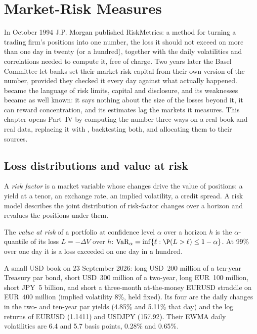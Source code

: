 \chapter{Market-Risk Measures}\label{ch:rc:market-risk-measures}

In October 1994 J.P. Morgan published RiskMetrics: a method for turning a trading firm's
positions into one number, the loss it should not exceed on more than one day in twenty (or
a hundred), together with the daily volatilities and correlations needed to compute it, free
of charge. Two years later the Basel Committee let banks set their market-risk capital from
their own version of the number, provided they checked it every day against what actually
happened.  became the language of risk limits, capital and disclosure, and its
weaknesses became as well known: it says nothing about the size of the losses beyond it, it
can reward concentration, and its estimates lag the markets it measures. This chapter opens
Part~IV by computing the number three ways on a real book and real data, replacing it with
, backtesting both, and allocating them to their sources.

\section{Loss distributions and value at risk}

\begin{definition}\label{def:rc:market-risk-measures:factor}
A \emph{risk factor} is a market variable whose changes drive the value
of positions: a yield at a tenor, an exchange rate, an implied volatility, a credit spread.
A risk model describes the joint distribution of risk-factor changes over a horizon and
revalues the positions under them.
\end{definition}

\begin{definition}\label{def:rc:market-risk-measures:var}
The \emph{value at risk} of a portfolio at confidence level $\alpha$ over a
horizon $h$ is the $\alpha$-quantile of its loss $L = -\Delta V$ over $h$:
$\mathrm{VaR}_\alpha = \inf\{\ell:\P(L>\ell)\le1-\alpha\}$. At 99\% over one day it is a loss exceeded on
one day in a hundred.
\end{definition}

\begin{example}\label{ex:rc:market-risk-measures:book}
A small USD book on 23 September 2026: long USD~200 million of a ten-year Treasury par bond,
short USD~300 million of a two-year, long EUR~100 million, short JPY~5 billion, and short a
three-month at-the-money EURUSD straddle on EUR~400 million (implied volatility 8\%, held
fixed). Its four  are the daily changes in the two- and ten-year par yields (4.85\%
and 5.11\% that day) and the log returns of EURUSD (1.1411) and USDJPY (157.92). Their EWMA
daily volatilities are 6.4 and 5.7 basis points, 0.28\% and 0.65\%.
\end{example}

